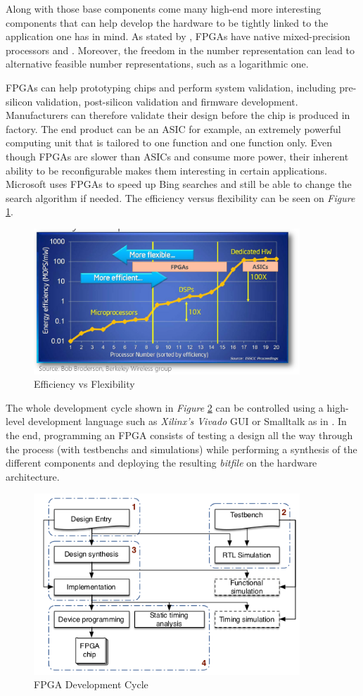 Along with those base components come many high-end more interesting components that can help develop the hardware to be tightly linked to the application one has in mind. As stated by \cite{Goddeke2007}, FPGAs have native mixed-precision processors and . Moreover, the freedom in the number representation can lead to alternative feasible number representations, such as a logarithmic one.

FPGAs can help prototyping chips and perform system validation, including pre-silicon validation, post-silicon validation and firmware development. Manufacturers can therefore validate their design before the chip is produced in factory. The end product can be an ASIC for example, an extremely powerful computing unit that is tailored to one function and one function only. Even though FPGAs are slower than ASICs and consume more power, their inherent ability to be reconfigurable makes them interesting in certain applications. Microsoft uses FPGAs to speed up Bing searches and still be able to change the search algorithm if needed. The efficiency versus flexibility can be seen on \emph{Figure} \ref{fig:EfficiencyVSFlexibility}.

\begin{figure}[htbp]
	\centering
		\includegraphics[width=10cm]{Figures/EfficiencyVSFlexibility.png}
	\caption[Efficiency VS Flexibility]{Efficiency vs Flexibility}
	\label{fig:EfficiencyVSFlexibility}
\end{figure}

The whole development cycle shown in \emph{Figure} \ref{fig:FPGACycle} can be controlled using a high-level development language such as \emph{Xilinx's Vivado} GUI or Smalltalk as in \cite{XuanSang2014}. In the end, programming an FPGA consists of testing a design all the way through the process (with testbenchs and simulations) while performing a synthesis of the different components and deploying the resulting \emph{bitfile} on the hardware architecture.

\begin{figure}[htbp]
	\centering
		\includegraphics[width=10cm]{Figures/FPGACycle.png}
	\caption[FPGA Development Cycle]{FPGA Development Cycle \cite{XuanSang2014}}
	\label{fig:FPGACycle}
\end{figure}

